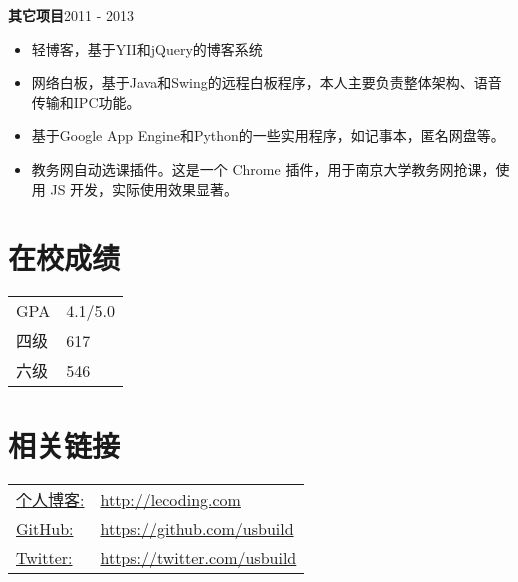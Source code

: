 \documentclass[margin]{res}
\begin{document}
\begin{resume}
{\bf 其它项目}\hfill 2011 - 2013
\begin{itemize} \itemsep -2pt
\item 轻博客，基于YII和jQuery的博客系统
\item 网络白板，基于Java和Swing的远程白板程序，本人主要负责整体架构、语音传输和IPC功能。
\item 基于Google App Engine和Python的一些实用程序，如记事本，匿名网盘等。
\item 教务网自动选课插件。这是一个 Chrome 插件，用于南京大学教务网抢课，使用 JS 开发，实际使用效果显著。
\end{itemize}

\section{在校成绩} 
   \begin{tabular}{l p{3in}}
      GPA &  4.1/5.0 \\
      四级 & 617 \\
      六级 & 546
 \end{tabular}

\section{相关链接}
   \begin{tabular}{l p{3in}}
     \underline{个人博客:} & \href{http://lecoding.com}{http://lecoding.com}\\
     \underline{GitHub:} &  \href{https://github.com/usbuild}{https://github.com/usbuild}\\
     \underline{Twitter:} & \href{https://twitter.com/usbuild}{https://twitter.com/usbuild}
 \end{tabular}

\end{resume} 
\end{document}
